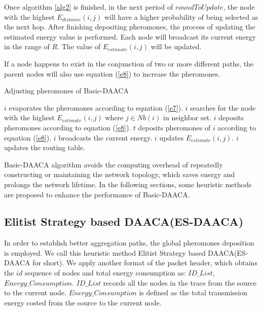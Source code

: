 \documentclass{elsarticle}
\begin{document}
Once algorithm \ref{alg2} is finished, in the next period of $roundToUpdate$, the node with the highest $E_{distance}(i,j)$ will have a higher probability of being selected as the next hop. After finishing depositing pheromones, the process of updating the estimated energy value is performed. Each node will broadcast its current energy in the range of $R$. The value of $E_{estimate}(i,j)$ will be updated.

If a node happens to exist in the conjunction of two or more different paths, the parent nodes will also use equation (\ref{e8}) to increase the pheromones.

\begin{algorithm}
\caption{Adjusting pheromones of Basic-DAACA} \label{alg2}
\begin{algorithmic}[1]
 \label{alg2EvaporatingDepositingStarts}
\STATE $i$ evaporates the pheromones according to equation (\ref{e7}).
\STATE $i$ searches for the node with the highest $E_{estimate}(i,j)$ where  $j \in Nb(i)$ in neighbor set.
\STATE $i$ deposits pheromones according to equation (\ref{e8}).
\STATE $t$ deposits pheromones of $i$ according to equation (\ref{e8}).
\STATE $i$ broadcasts the current energy.
\ENDFOR \label{alg2EvaporatingDepositingEnds}
\ENDIF
{} \label{alg2UpdateRoutingTableStarts}
\STATE $i$ updates $E_{estimate}(i,j)$.
\STATE $i$ updates the routing table.
\ENDIF \label{alg2UpdateRoutingTableEnds}
\ENDFOR
\end{algorithmic}
\end{algorithm}
Basic-DAACA algorithm avoids the computing overhead of repeatedly constructing or maintaining the network topology, which saves energy and prolongs the network lifetime. In the following sections, some heuristic methods are proposed to enhance the performance of Basic-DAACA.

\subsection{Elitist Strategy based DAACA(ES-DAACA)} \label{ESDAACA}
In order to establish better aggregation paths, the global pheromones deposition is employed. We call this heuristic method Elitist Strategy based DAACA(ES-DAACA for short). We apply another format of the packet header, which obtains the $id$ sequence of nodes and total energy consumption as: {$ID\_List$, $Energy\_Consumption$}. $ID\_List$ records all the nodes in the trace from the source to the current node. $Energy\_Consumption$ is defined as the total transmission energy costed from the source to the current node.
\end{document}
